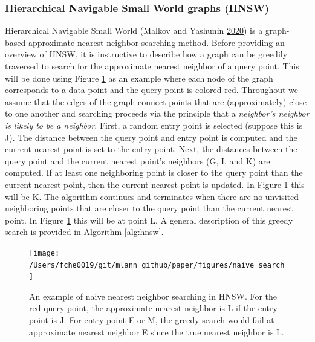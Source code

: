 \documentclass[12pt]{article}
\begin{document}
\hypertarget{hierarchical-navigable-small-world-graphs-hnsw}{%
\subsubsection*{Hierarchical Navigable Small World graphs (HNSW)}\label{hierarchical-navigable-small-world-graphs-hnsw}}

Hierarchical Navigable Small World (Malkov and Yashunin \protect\hyperlink{ref-Malkov2020-jp}{2020}) is a graph-based approximate nearest neighbor searching method. Before providing an overview of HNSW, it is instructive to describe how a graph can be greedily traversed to search for the approximate nearest neighbor of a query point. This will be done using Figure \ref{fig:naive} as an example where each node of the graph corresponds to a data point and the query point is colored red. Throughout we assume that the edges of the graph connect points that are (approximately) close to one another and searching proceeds via the principle that a \emph{neighbor's neighbor is likely to be a neighbor}. First, a random entry point is selected (suppose this is J). The distance between the query point and entry point is computed and the current nearest point is set to the entry point. Next, the distances between the query point and the current nearest point's neighbors (G, I, and K) are computed. If at least one neighboring point is closer to the query point than the current nearest point, then the current nearest point is updated. In Figure \ref{fig:naive} this will be K. The algorithm continues and terminates when there are no unvisited neighboring points that are closer to the query point than the current nearest point. In Figure \ref{fig:naive} this will be at point L. A general description of this greedy search is provided in Algorithm \ref{alg:hnsw}.

\begin{figure}

{\centering \texttt{[image: /Users/fche0019/git/mlann\_github/paper/figures/naive\_search]} 

}

\caption{An example of naive nearest neighbor searching in HNSW. For the red query point, the approximate nearest neighbor is L if the entry point is J. For entry point E or M, the greedy search would fail at approximate nearest neighbor E since the true nearest neighbor is L. }\label{fig:naive}
\end{figure}
\end{document}
